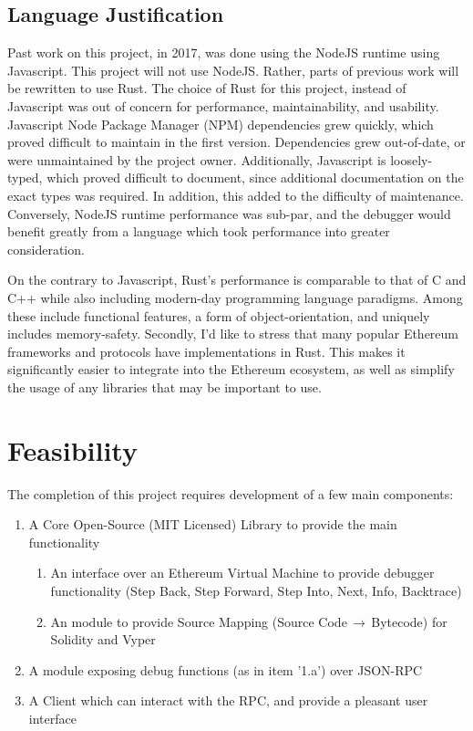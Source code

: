 \documentclass[]{report}
\begin{document}
\subsection{Language Justification}

Past work on this project, in 2017, was done using the NodeJS runtime using Javascript. This project will not use NodeJS. Rather, parts of previous work will be rewritten to use Rust. The choice of Rust for this project, instead of Javascript was out of concern for performance, maintainability, and usability. Javascript Node Package Manager (NPM) dependencies grew quickly, which proved difficult to maintain in the first version. Dependencies grew out-of-date, or were unmaintained by the project owner. Additionally, Javascript is loosely-typed, which proved difficult to document, since additional documentation on the exact types was required. In addition, this added to the difficulty of maintenance. Conversely, NodeJS runtime performance was sub-par, and the debugger would benefit greatly from a language which took performance into greater consideration.

On the contrary to Javascript, Rust's performance is comparable to that of C and C++ while also including modern-day programming language paradigms. Among these include functional features, a form of object-orientation, and uniquely includes memory-safety. Secondly, I'd like to stress that many popular Ethereum frameworks and protocols have implementations in Rust. This makes it significantly easier to integrate into the Ethereum ecosystem, as well as simplify the usage of any libraries that may be important to use.

\section{Feasibility}

The completion of this project requires development of a few main components: 
\begin{enumerate}
	\item{A Core Open-Source (MIT Licensed) Library to provide the main functionality}
	\begin{enumerate}
		\item {An interface over an Ethereum Virtual Machine to provide debugger functionality (Step Back, Step Forward, Step Into, Next, Info, Backtrace)}
		\item {An module to provide Source Mapping (Source Code$\, \to\, $Bytecode) for Solidity and Vyper}
	\end{enumerate}
	\item{A module exposing debug functions (as in item '1.a') over JSON-RPC}
	\item{A Client which can interact with the RPC, and provide a pleasant user interface}
\end{enumerate}
\end{document}
